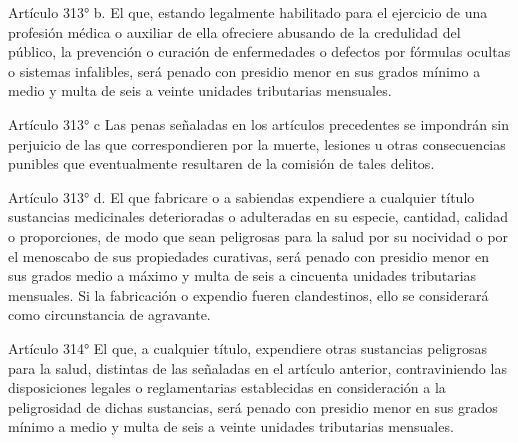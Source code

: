     Artículo 313° b. El que, estando legalmente habilitado para el ejercicio de una profesión médica o auxiliar de ella ofreciere abusando de la credulidad del público, la prevención o curación de enfermedades o defectos por fórmulas ocultas o sistemas infalibles, será penado con presidio menor en sus grados mínimo a medio y multa de seis a veinte unidades tributarias mensuales.






    Artículo 313° c Las penas señaladas en los artículos precedentes se impondrán sin perjuicio de las que correspondieren por la muerte, lesiones u otras consecuencias punibles que eventualmente resultaren de la comisión de tales delitos.

    Artículo 313° d. El que fabricare o a sabiendas expendiere a cualquier título sustancias medicinales deterioradas o adulteradas en su especie, cantidad, calidad o proporciones, de modo que sean peligrosas para la salud por su nocividad o por el menoscabo de sus propiedades curativas, será penado con presidio menor en sus grados medio a máximo y multa de seis a cincuenta unidades tributarias mensuales.
    Si la fabricación o expendio fueren clandestinos, ello se considerará como circunstancia de agravante.



    Artículo 314° El que, a cualquier título, expendiere otras sustancias peligrosas para la salud, distintas de las señaladas en el artículo anterior, contraviniendo las disposiciones legales o reglamentarias establecidas en consideración a la peligrosidad de dichas sustancias, será penado con presidio menor en sus grados mínimo a medio y multa de seis a veinte unidades tributarias mensuales.






